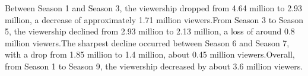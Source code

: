 \documentclass[
  letterpaper,
  DIV=11,
  numbers=noendperiod,
  oneside]{scrartcl}
\begin{document}
Between Season 1 and Season 3, the viewership dropped from 4.64 million
to 2.93 million, a decrease of approximately 1.71 million viewers.From
Season 3 to Season 5, the viewership declined from 2.93 million to 2.13
million, a loss of around 0.8 million viewers.The sharpest decline
occurred between Season 6 and Season 7, with a drop from 1.85 million to
1.4 million, about 0.45 million viewers.Overall, from Season 1 to Season
9, the viewership decreased by about 3.6 million viewers.
\end{document}
